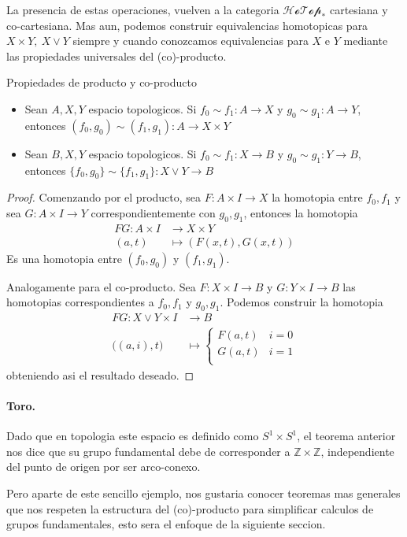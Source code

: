 La presencia de estas operaciones, vuelven a la categoria
\(\mathscr{HoTop}_*\) cartesiana y co-cartesiana. Mas aun, podemos
construir equivalencias homotopicas para \(X \times Y,\ X \vee Y\)
siempre y cuando conozcamos equivalencias para \(X\) e \(Y\) mediante
las propiedades universales del (co)-producto.

\begin{teorema}
  Propiedades de producto y co-producto
  \begin{itemize}
    \item Sean \(A, X, Y\) espacio topologicos. Si \(f_0 \sim f_1 : A \to
      X\) y \(g_0 \sim g_1 : A \to Y\), entonces \((f_0 , g_0) \sim (f_1
      , g_1): A \to X \times Y\)
    \item Sean \(B, X, Y\) espacio topologicos. Si \(f_0 \sim f_1 : X \to
      B\) y \(g_0 \sim g_1 : Y \to B\), entonces \(\{f_0 , g_0\} \sim
      \{f_1 , g_1\} : X \vee Y \to B\)
  \end{itemize}
\end{teorema}
\begin{proof}
Comenzando por el producto, sea \(F : A \times I \to X\) la homotopia
entre \(f_0 , f_1\) y sea \(G : A \times I \to Y\)
correspondientemente con \(g_0, g_1\), entonces la homotopia
\begin{align*}
  FG : A \times I &\to X \times Y \\
       (a, t) &\mapsto (F(x,t) , G(x,t))
\end{align*}
Es una homotopia entre \((f_0 , g_0)\) y \((f_1 , g_1)\).

Analogamente para el co-producto. Sea \(F : X \times I \to B\) y \(G : Y
\times I \to B\) las homotopias correspondientes a \(f_0 , f_1\) y \(g_0
, g_1\). Podemos construir la homotopia
\begin{align*}
  FG : X \vee Y \times I &\to B \\
  \big((a,i) , t \big) &\mapsto
                \begin{cases}
                  F(a,t) & i = 0 \\
                  G(a,t) & i = 1 \\
                \end{cases}
\end{align*}
obteniendo asi el resultado deseado.
\end{proof}

\paragraph{Toro.} Dado que en topologia este espacio es definido como
\(S^1 \times S^1\), el teorema anterior nos dice que su grupo
fundamental debe de corresponder a \(\mathbb Z \times \mathbb Z\),
independiente del punto de origen por ser arco-conexo.

Pero aparte de este sencillo ejemplo, nos gustaria conocer teoremas mas
generales que nos respeten la estructura del (co)-producto para
simplificar calculos de grupos fundamentales, esto sera el enfoque de la
siguiente seccion.